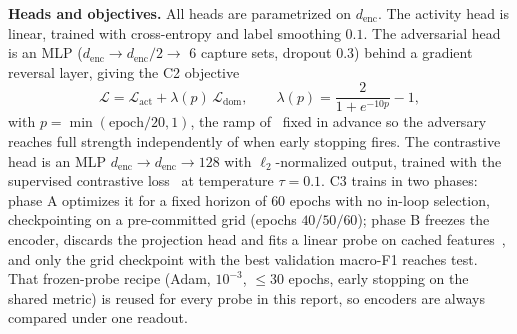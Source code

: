 \textbf{Heads and objectives.} All heads are parametrized on
$d_{\mathrm{enc}}$. The activity head is linear, trained with cross-entropy
and label smoothing $0.1$. The adversarial head is an MLP
($d_{\mathrm{enc}} \to d_{\mathrm{enc}}/2 \to$ 6 capture sets, dropout $0.3$)
behind a gradient reversal layer, giving the C2 objective
\begin{equation}
\mathcal{L} = \mathcal{L}_{\mathrm{act}} + \lambda(p)\,\mathcal{L}_{\mathrm{dom}},
\qquad
\lambda(p) = \frac{2}{1+e^{-10p}} - 1 ,
\label{eq:grl}
\end{equation}
with $p = \min(\mathrm{epoch}/20, 1)$, the ramp of~\cite{Ganin-2016} fixed in
advance so the adversary reaches full strength independently of when early
stopping fires.
The contrastive head is an MLP $d_{\mathrm{enc}} \to d_{\mathrm{enc}} \to 128$
with $\ell_2$-normalized output, trained with the supervised contrastive
loss~\cite{Khosla-2020} at temperature $\tau=0.1$. C3 trains in two phases: phase A optimizes it for a fixed horizon of $60$ epochs with no
in-loop selection, checkpointing on a pre-committed grid (epochs $40/50/60$);
phase B freezes the encoder, discards the projection head and fits a linear
probe on cached features~\cite{Chen-2020}, and only the grid checkpoint with the best
validation macro-F1 reaches test. That frozen-probe recipe (Adam, $10^{-3}$,
$\leq30$ epochs, early stopping on the shared metric) is reused for every
probe in this report, so encoders are always compared under one readout.

